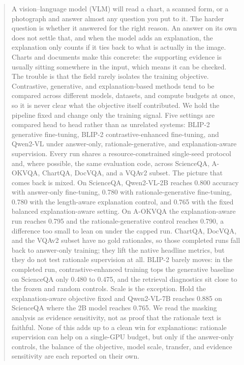 \documentclass[preprint,12pt]{elsarticle}
\begin{document}
\begin{frontmatter}
\begin{abstract}
A vision--language model (VLM) will read a chart, a scanned form, or a photograph and answer almost any question you put to it.
The harder question is whether it answered for the right reason.
An answer on its own does not settle that, and when the model adds an explanation, the explanation only counts if it ties back to what is actually in the image.
Charts and documents make this concrete: the supporting evidence is usually sitting somewhere in the input, which means it can be checked.
The trouble is that the field rarely isolates the training objective.
Contrastive, generative, and explanation-based methods tend to be compared across different models, datasets, and compute budgets at once, so it is never clear what the objective itself contributed.
We hold the pipeline fixed and change only the training signal.
Five settings are compared head to head rather than as unrelated systems: BLIP-2 generative fine-tuning, BLIP-2 contrastive-enhanced fine-tuning, and Qwen2-VL under answer-only, rationale-generative, and explanation-aware supervision.
Every run shares a resource-constrained single-seed protocol and, where possible, the same evaluation code, across ScienceQA, A-OKVQA, ChartQA, DocVQA, and a VQAv2 subset.
The picture that comes back is mixed.
On ScienceQA, Qwen2-VL-2B reaches 0.800 accuracy with answer-only fine-tuning, 0.780 with rationale-generative fine-tuning, 0.780 with the length-aware explanation control, and 0.765 with the fixed balanced explanation-aware setting.
On A-OKVQA the explanation-aware run reaches 0.795 and the rationale-generative control reaches 0.790, a difference too small to lean on under the capped run.
ChartQA, DocVQA, and the VQAv2 subset have no gold rationales, so those completed runs fall back to answer-only training; they lift the native headline metrics, but they do not test rationale supervision at all.
BLIP-2 barely moves: in the completed run, contrastive-enhanced training tops the generative baseline on ScienceQA only 0.480 to 0.475, and the retrieval diagnostics sit close to the frozen and random controls.
Scale is the exception.
Hold the explanation-aware objective fixed and Qwen2-VL-7B reaches 0.885 on ScienceQA where the 2B model reaches 0.765.
We read the masking analysis as evidence sensitivity, not as proof that the rationale text is faithful.
None of this adds up to a clean win for explanations: rationale supervision can help on a single-GPU budget, but only if the answer-only controls, the balance of the objective, model scale, transfer, and evidence sensitivity are each reported on their own.
\end{abstract}


\end{frontmatter}
\end{document}
